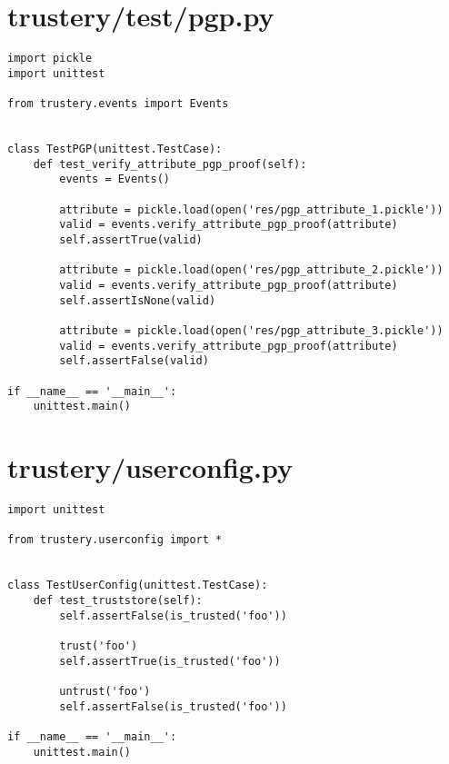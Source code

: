 \documentclass[12pt]{report}
\begin{document}
	\section{trustery/test/pgp.py}
	\begin{lstlisting}
import pickle
import unittest

from trustery.events import Events


class TestPGP(unittest.TestCase):
    def test_verify_attribute_pgp_proof(self):
        events = Events()

        attribute = pickle.load(open('res/pgp_attribute_1.pickle'))
        valid = events.verify_attribute_pgp_proof(attribute)
        self.assertTrue(valid)

        attribute = pickle.load(open('res/pgp_attribute_2.pickle'))
        valid = events.verify_attribute_pgp_proof(attribute)
        self.assertIsNone(valid)

        attribute = pickle.load(open('res/pgp_attribute_3.pickle'))
        valid = events.verify_attribute_pgp_proof(attribute)
        self.assertFalse(valid)

if __name__ == '__main__':
    unittest.main()
	\end{lstlisting}
	
	\section{trustery/userconfig.py}
	\begin{lstlisting}
import unittest

from trustery.userconfig import *


class TestUserConfig(unittest.TestCase):
    def test_truststore(self):
        self.assertFalse(is_trusted('foo'))

        trust('foo')
        self.assertTrue(is_trusted('foo'))

        untrust('foo')
        self.assertFalse(is_trusted('foo'))

if __name__ == '__main__':
    unittest.main()
	\end{lstlisting}
	
\end{document}
